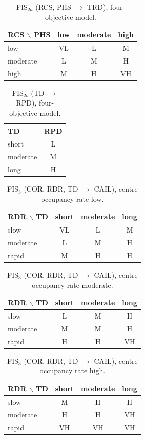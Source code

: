 \begin{table}[h]
\centering
\caption{FIS$_{2a}$ (RCS, PHS $\to$ TRD), four-objective model.}\label{tab:s-fis2a}
\small
\begin{tabular}{lccc}
\toprule
RCS $\backslash$ PHS & low & moderate & high\\
\midrule
low & VL & L & M\\
moderate & L & M & H\\
high & M & H & VH\\
\bottomrule
\end{tabular}
\end{table}

\begin{table}[h]
\centering
\caption{FIS$_{2b}$ (TD $\to$ RPD), four-objective model.}\label{tab:s-fis2b}
\small
\begin{tabular}{lc}
\toprule
TD & RPD\\
\midrule
short & L\\
moderate & M\\
long & H\\
\bottomrule
\end{tabular}
\end{table}

\begin{table}[h]
\centering
\caption{FIS$_3$ (COR, RDR, TD $\to$ CAIL), centre occupancy rate low.}\label{tab:s-fis3-low}
\small
\begin{tabular}{lccc}
\toprule
RDR $\backslash$ TD & short & moderate & long\\
\midrule
slow & VL & L & M\\
moderate & L & M & H\\
rapid & M & H & H\\
\bottomrule
\end{tabular}
\end{table}

\begin{table}[h]
\centering
\caption{FIS$_3$ (COR, RDR, TD $\to$ CAIL), centre occupancy rate moderate.}\label{tab:s-fis3-moderate}
\small
\begin{tabular}{lccc}
\toprule
RDR $\backslash$ TD & short & moderate & long\\
\midrule
slow & L & M & H\\
moderate & M & M & H\\
rapid & H & H & VH\\
\bottomrule
\end{tabular}
\end{table}

\begin{table}[h]
\centering
\caption{FIS$_3$ (COR, RDR, TD $\to$ CAIL), centre occupancy rate high.}\label{tab:s-fis3-high}
\small
\begin{tabular}{lccc}
\toprule
RDR $\backslash$ TD & short & moderate & long\\
\midrule
slow & M & H & H\\
moderate & H & H & VH\\
rapid & VH & VH & VH\\
\bottomrule
\end{tabular}
\end{table}

